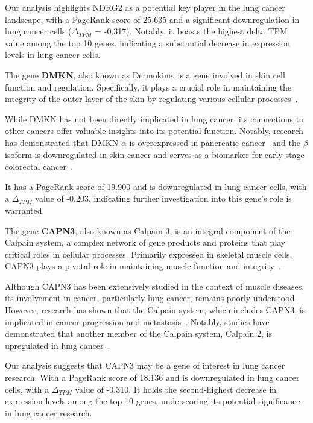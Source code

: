 Our analysis highlights NDRG2 as a potential key player in the lung cancer landscape,
with a PageRank score of 25.635 and a significant downregulation in lung cancer cells ($\Delta_{TPM}$ = -0.317).
Notably, it boasts the highest delta TPM value among the top 10 genes,
indicating a substantial decrease in expression levels in lung cancer cells.
\newline

The gene \textbf{DMKN}, also known as Dermokine, is a gene involved in skin cell function and regulation.
Specifically, it plays a crucial role in maintaining the integrity of the outer layer of the skin
by regulating various cellular processes~\cite{Naso2007Deromokine}.

While DMKN has not been directly implicated in lung cancer, its connections to other cancers offer valuable insights into its potential function.
Notably, research has demonstrated that DMKN-$\alpha$ is overexpressed in pancreatic cancer~\cite{Zhang2022DMKN}
and the $\beta$ isoform is downregulated in skin cancer and serves as a biomarker for early-stage colorectal cancer~\cite{Hasegawa2012Dermokine}.

It has a PageRank score of 19.900 and is downregulated in lung cancer cells,
with a $\Delta_{TPM}$ value of -0.203, indicating further investigation into this gene's role is warranted.
\newline

The gene \textbf{CAPN3}, also known as Calpain 3, is an integral component of the Calpain system,
a complex network of gene products and proteins that play critical roles in cellular processes.
Primarily expressed in skeletal muscle cells, CAPN3 plays a pivotal role in maintaining muscle function and integrity~\cite{Spinozzi2021Calpain}.

Although CAPN3 has been extensively studied in the context of muscle diseases,
its involvement in cancer, particularly lung cancer, remains poorly understood.
However, research has shown that the Calpain system, which includes CAPN3, is implicated in cancer progression and metastasis~\cite{Storr2011Calpain}.
Notably, studies have demonstrated that another member of the Calpain system, Calpain 2, is upregulated in lung cancer~\cite{Xu2019Calpain}.

Our analysis suggests that CAPN3 may be a gene of interest in lung cancer research.
With a PageRank score of 18.136 and is downregulated in lung cancer cells,
with a $\Delta_{TPM}$ value of -0.310.
It holds the second-highest decrease in expression levels among the top 10 genes,
underscoring its potential significance in lung cancer research.
\newline

